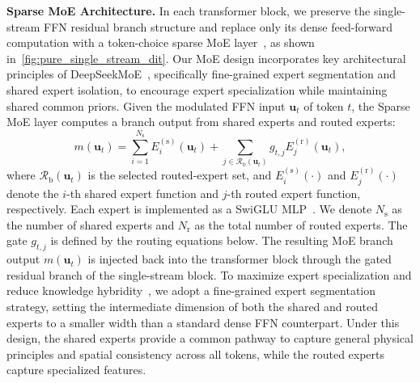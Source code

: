 \noindent\textbf{Sparse MoE Architecture.}
In each transformer block, we preserve the single-stream FFN residual branch structure and replace only its dense feed-forward computation with a token-choice sparse MoE layer~\cite{shazeer2017moe,lepikhin2020gshard,switchtransformer}, as shown in~\cref{fig:pure_single_stream_dit}. Our MoE design incorporates key architectural principles of DeepSeekMoE~\cite{dai2024deepseekmoe,deepseek2024v3}, specifically fine-grained expert segmentation and shared expert isolation, to encourage expert specialization while maintaining shared common priors. Given the modulated FFN input $\mathbf{u}_t$ of token $t$, the Sparse MoE layer computes a branch output from shared experts and routed experts:
\begin{equation}
m(\mathbf{u}_t) = \sum_{i=1}^{N_{\mathrm{s}}} E_i^{(\mathrm{s})}(\mathbf{u}_t) + \sum_{j \in \mathcal{R}_{\mathrm{b}}(\mathbf{u}_t)} g_{t,j} E_j^{(\mathrm{r})}(\mathbf{u}_t),
\end{equation}
where $\mathcal{R}_{\mathrm{b}}(\mathbf{u}_t)$ is the selected routed-expert set, and $E_i^{(\mathrm{s})}(\cdot)$ and $E_j^{(\mathrm{r})}(\cdot)$ denote the $i$-th shared expert function and $j$-th routed expert function, respectively. Each expert is implemented as a SwiGLU MLP~\cite{shazeer2020gluvariantsimprovetransformer}. We denote $N_{\mathrm{s}}$ as the number of shared experts and $N_{\mathrm{r}}$ as the total number of routed experts. The gate $g_{t,j}$ is defined by the routing equations below. The resulting MoE branch output $m(\mathbf{u}_t)$ is injected back into the transformer block through the gated residual branch of the single-stream block. To maximize expert specialization and reduce knowledge hybridity~\cite{dai2024deepseekmoe}, we adopt a fine-grained expert segmentation strategy, setting the intermediate dimension of both the shared and routed experts to a smaller width than a standard dense FFN counterpart. Under this design, the shared experts provide a common pathway to capture general physical principles and spatial consistency across all tokens, while the routed experts capture specialized features.

